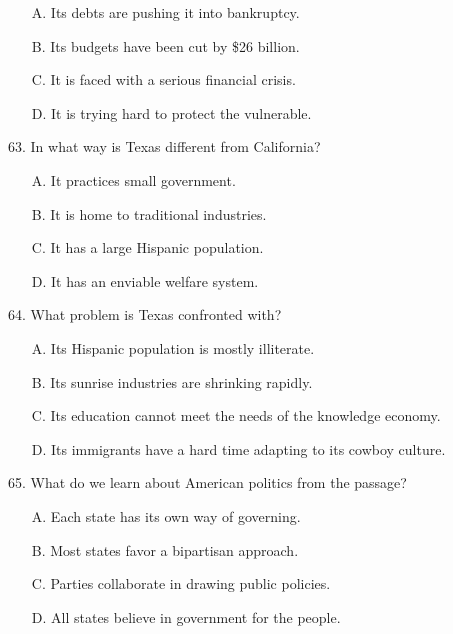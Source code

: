 \documentclass[UTF8,11pt]{ctexart}
\begin{document}
\begin{itemize}[leftmargin=2em,itemsep=.2em,topsep=.4em]\item[A.] Its debts are pushing it into bankruptcy.
\item[B.] Its budgets have been cut by \$26 billion.
\item[C.] It is faced with a serious financial crisis.
\item[D.] It is trying hard to protect the vulnerable.
\end{itemize}

63. In what way is Texas different from California?


\begin{itemize}[leftmargin=2em,itemsep=.2em,topsep=.4em]\item[A.] It practices small government.
\item[B.] It is home to traditional industries.
\item[C.] It has a large Hispanic population.
\item[D.] It has an enviable welfare system.
\end{itemize}

64. What problem is Texas confronted with?


\begin{itemize}[leftmargin=2em,itemsep=.2em,topsep=.4em]\item[A.] Its Hispanic population is mostly illiterate.
\item[B.] Its sunrise industries are shrinking rapidly.
\item[C.] Its education cannot meet the needs of the knowledge economy.
\item[D.] Its immigrants have a hard time adapting to its cowboy culture.
\end{itemize}

65. What do we learn about American politics from the passage?


\begin{itemize}[leftmargin=2em,itemsep=.2em,topsep=.4em]\item[A.] Each state has its own way of governing.
\item[B.] Most states favor a bipartisan approach.
\end{itemize}

\begin{itemize}[leftmargin=2em,itemsep=.2em,topsep=.4em]\item[C.] Parties collaborate in drawing public policies.
\item[D.] All states believe in government for the people.
\end{itemize}
\end{document}
